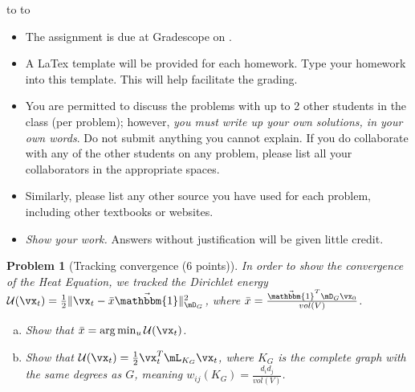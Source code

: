 \documentclass[10pt]{article}
\newcommand{\1}{\vec{\mathbbm{1}}}
\newcommand{\handout}{
\renewcommand{\thepage}{H\hnumber-\arabic{page}}
\noindent
\begin{center}
\vbox{
\hbox to \columnwidth {\sc{\course} --- \prof \hfill}
\vspace{-2mm}
\hbox to \columnwidth {\sc due \MakeLowercase{\duedate} \duelocation\hfill {\
Huge\color{mdb}H\hnumber.\yourname}}
}
\end{center}
\vspace*{2mm}
}
\newtheorem{problem}{\sc\color{cit}Problem}
\begin{document}
\handout
\begin{itemize}
\item The assignment is due at Gradescope on \duedate.
\item A LaTex template will be provided for each homework. Type your homework into
this template. This will help facilitate the grading.
\item You are permitted to discuss the problems with up to 2 other students in the
class (per problem); however, {\em you must write up your own solutions, in your
own words}. Do not submit anything you cannot explain. If you do collaborate with
any of the other students on any problem, please list all your collaborators in the
appropriate spaces.
\item Similarly, please list any other source you have used for each problem,
including other textbooks or websites.
\item {\em Show your work.} Answers without justification will be given little
credit.
\end{itemize}
\newpage
\begin{problem}[Tracking convergence (6 points)]
In order to show the convergence of the Heat Equation, we tracked the Dirichlet
energy $\mathcal{U}(\vx_t) = \frac{1}{2}\|\vx_t - \bar{x} \1\|_{\mD_G}^2$, where $\bar{x} = \frac{\1^T\mD_G \vx_0}{vol(V)}$.
\begin{enumerate}[(a)]
\item Show that $\bar{x} = \arg \min_{u} \mathcal{U}(\vx_t)$.
\item Show that $\mathcal{U}(\vx_t) = \frac{1}{2}\vx_t^T \mL_{K_G} \vx_t$,
where $K_G$ is the complete graph with the same degrees as $G$, meaning $w_{ij}
(K_G) = \frac{d_i d_j}{vol(V)}$.
\end{enumerate}
\end{problem}
\end{document}
